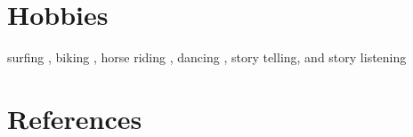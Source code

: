 \documentclass[10pt, letter]{article}
\begin{document}
\vspace{-2em}\section*{\bf Hobbies}

surfing , biking , horse riding , dancing , story telling, and story listening\\[.2cm]



\vspace{-2em}\section*{\bf References}

\end{document}
